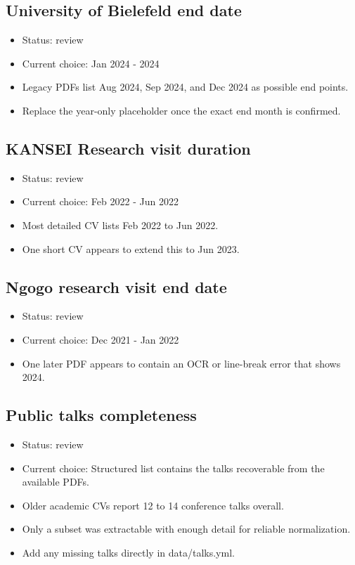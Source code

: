 \documentclass[
  oneside]{article}
\providecommand{\tightlist}{%
  \setlength{\itemsep}{0pt}\setlength{\parskip}{0pt}}
\begin{document}
\subsection{University of Bielefeld end
date}\label{university-of-bielefeld-end-date}

\begin{itemize}
\tightlist
\item
  Status: review
\item
  Current choice: Jan 2024 - 2024
\item
  Legacy PDFs list Aug 2024, Sep 2024, and Dec 2024 as possible end
  points.
\item
  Replace the year-only placeholder once the exact end month is
  confirmed.
\end{itemize}

\subsection{KANSEI Research visit
duration}\label{kansei-research-visit-duration}

\begin{itemize}
\tightlist
\item
  Status: review
\item
  Current choice: Feb 2022 - Jun 2022
\item
  Most detailed CV lists Feb 2022 to Jun 2022.
\item
  One short CV appears to extend this to Jun 2023.
\end{itemize}

\subsection{Ngogo research visit end
date}\label{ngogo-research-visit-end-date}

\begin{itemize}
\tightlist
\item
  Status: review
\item
  Current choice: Dec 2021 - Jan 2022
\item
  One later PDF appears to contain an OCR or line-break error that shows
  2024.
\end{itemize}

\subsection{Public talks completeness}\label{public-talks-completeness}

\begin{itemize}
\tightlist
\item
  Status: review
\item
  Current choice: Structured list contains the talks recoverable from
  the available PDFs.
\item
  Older academic CVs report 12 to 14 conference talks overall.
\item
  Only a subset was extractable with enough detail for reliable
  normalization.
\item
  Add any missing talks directly in data/talks.yml.
\end{itemize}
\end{document}
